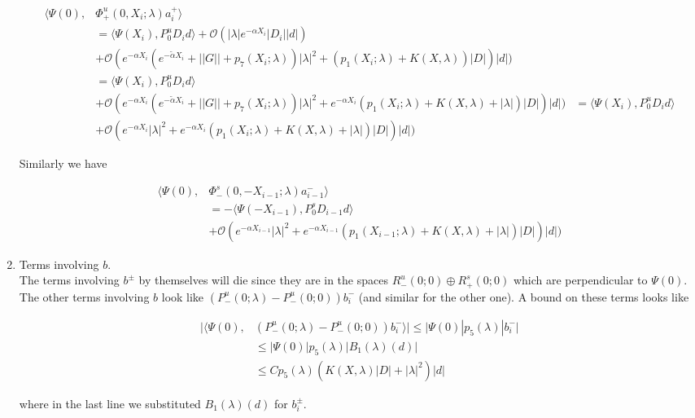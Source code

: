 \documentclass[12pt]{article}
\begin{document}
\begin{enumerate}
\begin{align*}
\langle \Psi(0), &\Phi^u_+(0, X_i; \lambda) a_i^+ \rangle \\
&= \langle \Psi(X_i), P^u_0 D_i d \rangle  + \mathcal{O}(|\lambda| e^{-\alpha X_i}|D_i||d|) \\
&+ \mathcal{O}(e^{-\alpha X_i}(e^{-\tilde{\alpha} X_i} + ||G|| + p_7(X_i; \lambda))|\lambda|^2 + (p_1(X_i; \lambda) + K(X, \lambda) ) |D|)|d|) \\
&= \langle \Psi(X_i), P^u_0 D_i d \rangle \\
&+ \mathcal{O}(e^{-\alpha X_i}(e^{-\tilde{\alpha} X_i} + ||G|| + p_7(X_i; \lambda))|\lambda|^2 + e^{-\alpha X_i}(p_1(X_i; \lambda) + K(X, \lambda) + |\lambda|) |D|)|d|)
&= \langle \Psi(X_i), P^u_0 D_i d \rangle \\
&+ \mathcal{O}(e^{-\alpha X_i}|\lambda|^2 + e^{-\alpha X_i}(p_1(X_i; \lambda) + K(X, \lambda) + |\lambda|) |D|)|d|)
\end{align*}

Similarly we have

\begin{align*}
\langle \Psi(0), &\Phi^s_-(0, -X_{i-1}; \lambda)a_{i-1}^- \rangle \\
&= -\langle \Psi(-X_{i-1}), P^s_0 D_{i-1} d \rangle \\
&+ \mathcal{O}(e^{-\alpha X_{i-1}}|\lambda|^2 + e^{-\alpha X_{i-1}}(p_1(X_{i-1}; \lambda) + K(X, \lambda) + |\lambda|) |D|)|d|)
\end{align*}

\item Terms involving $b$.\\

The terms involving $b^\pm$ by themselves will die since they are in the spaces $R^u_-(0; 0) \oplus R^s_+(0; 0)$ which are perpendicular to $\Psi(0)$.\\

The other terms involving $b$ look like $(P^u_-(0; \lambda) - P^u_-(0; 0))b_i^-$ (and similar for the other one). A bound on these terms looks like

\begin{align*}
|\langle \Psi(0), &(P^u_-(0; \lambda) - P^u_-(0; 0))b_i^- \rangle|
\leq |\Psi(0)| p_5(\lambda)|b_i^-| \\
&\leq |\Psi(0)| p_5(\lambda)|B_1(\lambda)(d)| \\
&\leq C p_5(\lambda) ( K(X, \lambda) |D|+ |\lambda|^2 )|d|
\end{align*}

where in the last line we substituted $B_1(\lambda)(d)$ for $b_i^\pm$.\\


\end{enumerate}
\end{document}
